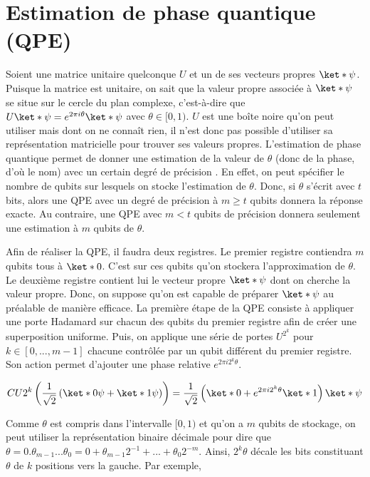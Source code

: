 \section{Estimation de phase quantique (QPE)}
Soient une matrice unitaire quelconque $U$ et un de ses vecteurs propres $\ket*{\psi}$. Puisque la matrice est unitaire, on sait que la valeur propre associée à $\ket*{\psi}$ se situe sur le cercle du plan complexe, c'est-à-dire que $U\ket*{\psi} = e^{2\pi i \theta}\ket*{\psi}$ avec $\theta \in [0,1)$.  $U$ est une boîte noire qu'on peut utiliser mais dont on ne connaît rien, il n'est donc pas possible d'utiliser sa représentation matricielle pour trouver ses valeurs propres. L'estimation de phase quantique permet de donner une estimation de la valeur de $\theta$ (donc de la phase, d'où le nom) avec un certain degré de précision \cite{nielsen00}. En effet, on peut spécifier le nombre de qubits sur lesquels on stocke l'estimation de $\theta$. Donc, si $\theta$ s'écrit avec $t$ bits, alors une QPE avec un degré de précision à $m \ge t$ qubits donnera la réponse exacte. Au contraire, une QPE avec $m  < t$ qubits de précision donnera seulement une estimation à $m$ qubits de $\theta$.

Afin de réaliser la QPE, il faudra deux registres. Le premier registre contiendra $m$ qubits tous à $\ket*{0}$. C'est sur ces qubits qu'on stockera l'approximation de $\theta$. Le deuxième registre contient lui le vecteur propre $\ket*{\psi}$ dont on cherche la valeur propre. Donc, on suppose qu'on est capable de préparer $\ket*{\psi}$ au préalable de manière efficace. La première étape de la QPE consiste à appliquer une porte Hadamard sur chacun des qubits du premier registre afin de créer une superposition uniforme. Puis, on applique une série de portes $U^{2^k}$ pour $k \in [0, ..., m-1 ]$ chacune contrôlée par un qubit différent du premier registre. Son action permet d'ajouter une phase relative $e^{2\pi i 2^k \theta}$.

\begin{equation*}
    CU{2^k}\left(\frac{1}{\sqrt{2}}\left(\ket*{0\psi} + \ket*{1\psi}\right)\right) = \frac{1}{\sqrt{2}}\left(\ket*{0} + e^{2\pi i 2^k \theta}\ket*{1}\right) \ket*{\psi}
\end{equation*}

Comme $\theta$ est compris dans l'intervalle $[0,1)$ et qu'on a $m$ qubits de stockage, on peut utiliser la représentation binaire décimale pour dire que $\theta = 0\pmb{.}\theta_{m-1}...\theta_{0} = 0 + \theta_{m-1}2^{-1} + ... + \theta_{0}2^{-m}$. Ainsi, $2^k \theta$ décale les bits constituant $\theta$ de $k$ positions vers la gauche. Par exemple, 

